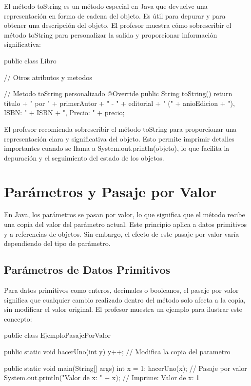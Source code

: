 \documentclass[a4paper]{report}
\begin{document}
El método toString es un método especial en Java que devuelve una representación en forma de cadena del objeto. Es útil para depurar y para obtener una descripción del objeto. El profesor muestra cómo sobrescribir el método toString para personalizar la salida y proporcionar información significativa:

\begin{roundedlst}
public class Libro {
    // Otros atributos y metodos

    // Metodo toString personalizado
    @Override
    public String toString() {
        return titulo + " por " + primerAutor + " - " 
        + editorial + " (" + anioEdicion + "), ISBN: "
        + ISBN + ", Precio: " + precio;
    }
}
\end{roundedlst}

El profesor recomienda sobrescribir el método toString para proporcionar una representación clara y significativa del objeto. Esto permite imprimir detalles importantes cuando se llama a System.out.println(objeto), lo que facilita la depuración y el seguimiento del estado de los objetos.

\section{Parámetros y Pasaje por Valor}
En Java, los parámetros se pasan por valor, lo que significa que el método recibe una copia del valor del parámetro actual. Este principio aplica a datos primitivos y a referencias de objetos. Sin embargo, el efecto de este pasaje por valor varía dependiendo del tipo de parámetro.

\subsection{Parámetros de Datos Primitivos}
Para datos primitivos como enteros, decimales o booleanos, el pasaje por valor significa que cualquier cambio realizado dentro del método solo afecta a la copia, sin modificar el valor original. El profesor muestra un ejemplo para ilustrar este concepto:

\begin{roundedlst}
public class EjemploPasajePorValor {
    public static void hacerUno(int y) {
        y++; // Modifica la copia del parametro
    }

    public static void main(String[] args) {
        int x = 1;
        hacerUno(x); // Pasaje por valor
        System.out.println("Valor de x: " + x); 
        // Imprime: Valor de x: 1
    }
}
\end{roundedlst}
\end{document}
